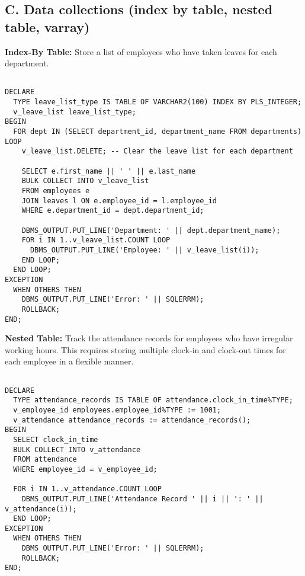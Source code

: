 \documentclass[11pt]{article} %
\begin{document}
\subsection*{C. Data collections (index by table, nested table, varray)}

\textbf{Index-By Table:} Store a list of employees who have taken leaves for each department.

\begin{small}
\begin{verbatim}

DECLARE
  TYPE leave_list_type IS TABLE OF VARCHAR2(100) INDEX BY PLS_INTEGER;
  v_leave_list leave_list_type;
BEGIN
  FOR dept IN (SELECT department_id, department_name FROM departments) LOOP
    v_leave_list.DELETE; -- Clear the leave list for each department

    SELECT e.first_name || ' ' || e.last_name
    BULK COLLECT INTO v_leave_list
    FROM employees e
    JOIN leaves l ON e.employee_id = l.employee_id
    WHERE e.department_id = dept.department_id;

    DBMS_OUTPUT.PUT_LINE('Department: ' || dept.department_name);
    FOR i IN 1..v_leave_list.COUNT LOOP
      DBMS_OUTPUT.PUT_LINE('Employee: ' || v_leave_list(i));
    END LOOP;
  END LOOP;
EXCEPTION
  WHEN OTHERS THEN
    DBMS_OUTPUT.PUT_LINE('Error: ' || SQLERRM);
    ROLLBACK;
END;

\end{verbatim}
\end{small}

\textbf{Nested Table:} Track the attendance records for employees who have irregular working hours. This requires storing multiple clock-in and clock-out times for each employee in a flexible manner.

\begin{small}
\begin{verbatim}

DECLARE
  TYPE attendance_records IS TABLE OF attendance.clock_in_time%TYPE;
  v_employee_id employees.employee_id%TYPE := 1001;
  v_attendance attendance_records := attendance_records();
BEGIN
  SELECT clock_in_time
  BULK COLLECT INTO v_attendance
  FROM attendance
  WHERE employee_id = v_employee_id;

  FOR i IN 1..v_attendance.COUNT LOOP
    DBMS_OUTPUT.PUT_LINE('Attendance Record ' || i || ': ' || v_attendance(i));
  END LOOP;
EXCEPTION
  WHEN OTHERS THEN
    DBMS_OUTPUT.PUT_LINE('Error: ' || SQLERRM);
    ROLLBACK;
END;


\end{verbatim}
\end{small}
\end{document}
